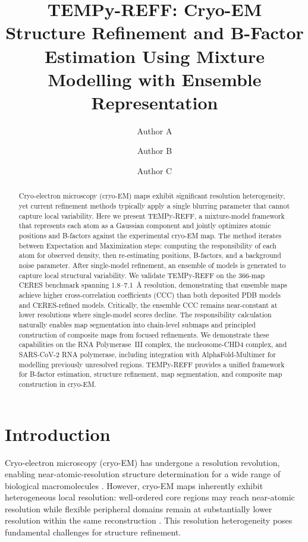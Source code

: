 \documentclass[11pt,a4paper]{article}
\title{TEMPy-REFF: Cryo-EM Structure Refinement and B-Factor Estimation Using Mixture Modelling with Ensemble Representation}
\author[1]{Author A}
\author[1]{Author B}
\author[1,2]{Author C}
\affil[1]{Department of Biological Sciences, Birkbeck College, University of London, London, UK}
\affil[2]{Corresponding author: \texttt{author.c@bbk.ac.uk}}
\date{}
\begin{document}
\maketitle

\begin{abstract}
Cryo-electron microscopy (cryo-EM) maps exhibit significant resolution heterogeneity, yet current refinement methods typically apply a single blurring parameter that cannot capture local variability. Here we present TEMPy-REFF, a mixture-model framework that represents each atom as a Gaussian component and jointly optimizes atomic positions and B-factors against the experimental cryo-EM map. The method iterates between Expectation and Maximization steps: computing the responsibility of each atom for observed density, then re-estimating positions, B-factors, and a background noise parameter. After single-model refinement, an ensemble of models is generated to capture local structural variability. We validate TEMPy-REFF on the 366-map CERES benchmark spanning 1.8--7.1~\AA{} resolution, demonstrating that ensemble maps achieve higher cross-correlation coefficients (CCC) than both deposited PDB models and CERES-refined models. Critically, the ensemble CCC remains near-constant at lower resolutions where single-model scores decline. The responsibility calculation naturally enables map segmentation into chain-level submaps and principled construction of composite maps from focused refinements. We demonstrate these capabilities on the RNA Polymerase~III complex, the nucleosome-CHD4 complex, and SARS-CoV-2 RNA polymerase, including integration with AlphaFold-Multimer for modelling previously unresolved regions. TEMPy-REFF provides a unified framework for B-factor estimation, structure refinement, map segmentation, and composite map construction in cryo-EM.
\end{abstract}

\section{Introduction}

Cryo-electron microscopy (cryo-EM) has undergone a resolution revolution, enabling near-atomic-resolution structure determination for a wide range of biological macromolecules \citep{Kuhlbrandt2014, Cheng2015, Nogales2016}. However, cryo-EM maps inherently exhibit heterogeneous local resolution: well-ordered core regions may reach near-atomic resolution while flexible peripheral domains remain at substantially lower resolution within the same reconstruction \citep{Kucukelbir2014, Cardone2013}. This resolution heterogeneity poses fundamental challenges for structure refinement.
\end{document}
